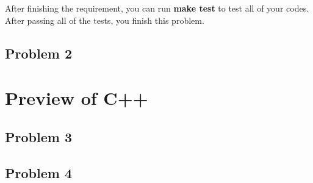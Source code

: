 \documentclass{report}
\begin{document}
After finishing the requirement, you can run \textbf{make test} to test all of
your codes. After passing all of the tests, you finish this problem.

\section{Problem 2}

\chapter{Preview of C++}

\section{Problem 3}

\section{Problem 4}
\end{document}
